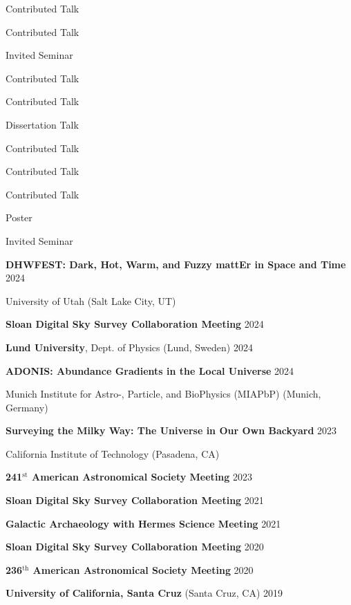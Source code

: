 \documentclass[cv.tex]{subfiles}
\begin{document}
\newpage
\noindent
\parbox{0.18\textwidth}{%
	\raggedleft
	Contributed Talk \par
	\null \par
	Contributed Talk \par
	Invited Seminar \par
	Contributed Talk \par
	\null \par
	Contributed Talk \par
	\null \par
	Dissertation Talk \par
	Contributed Talk \par
	Contributed Talk \par
	Contributed Talk \par
	Poster \par
	Invited Seminar \par
}
\hspace{1mm}
\parbox{0.8\textwidth}{%
	\vspace{1mm}
	\textbf{DHWFEST: Dark, Hot, Warm, and Fuzzy mattEr in Space and Time}
	\hfill 2024 \par
	University of Utah (Salt Lake City, UT) \par
	\textbf{Sloan Digital Sky Survey Collaboration Meeting} \hfill 2024 \par
	\textbf{Lund University}, Dept. of Physics (Lund, Sweden) \hfill 2024 \par
	\textbf{ADONIS: Abundance Gradients in the Local Universe}
	\hfill 2024 \par
	Munich Institute for Astro-, Particle, and BioPhysics (MIAPbP)
	(Munich, Germany) \par
	\textbf{Surveying the Milky Way: The Universe in Our Own Backyard}
	\hfill 2023 \par
	California Institute of Technology (Pasadena, CA) \par
	\textbf{241$^\text{st}$ American Astronomical Society Meeting}
	\hfill 2023 \par
	\textbf{Sloan Digital Sky Survey Collaboration Meeting}
	\hfill 2021 \par
	\textbf{Galactic Archaeology with Hermes Science Meeting}
	\hfill 2021 \par
	\textbf{Sloan Digital Sky Survey Collaboration Meeting}
	\hfill 2020 \par
	\textbf{236$^\text{th}$ American Astronomical Society Meeting}
	\hfill 2020 \par
	\textbf{University of California, Santa Cruz} (Santa Cruz, CA) \hfill 2019
	\par
}
\end{document}
